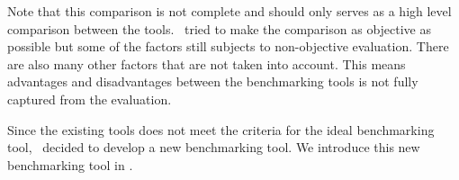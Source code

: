 Note that this comparison is not complete and should only serves as a high level comparison between the tools.
\First~tried to make the comparison as objective as possible but some of the factors still subjects to non-objective evaluation.
There are also many other factors that are not taken into account.
This means advantages and disadvantages between the benchmarking tools is not fully captured from the evaluation.

Since the existing tools does not meet the criteria for the ideal benchmarking tool, \first~decided to develop a new benchmarking tool.
We introduce this new benchmarking tool in .

